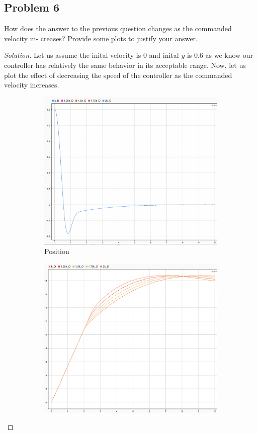 \documentclass{article}
\begin{document}
\subsection*{Problem 6}
How does the answer to the previous question changes as the commanded velocity in-
creases? Provide some plots to justify your answer.

\begin{proof}[Solution]

Let us assume the inital velocity is 0 and inital $y$ is 0.6 as we know our controller has relatively the same behavior in its acceptable range.
Now, let us plot the effect of decreasing the speed of the controller as the commanded velocity increases.

\begin{figure}[h!]
    \centering
    \begin{subfigure}{0.4\linewidth}
      \includegraphics[width=\linewidth]{img26.png}
      \caption{Position}
    \end{subfigure}
    \begin{subfigure}{0.4\linewidth}
      \includegraphics[width=\linewidth]{img27.png}

\end{subfigure}
\end{figure}
\end{proof}
\end{document}
